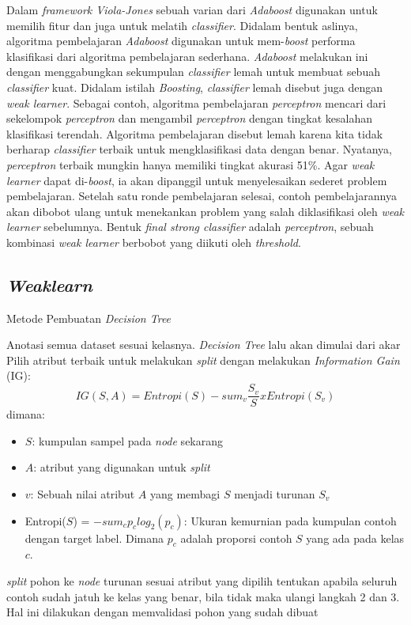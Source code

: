 Dalam \emph{framework Viola-Jones} sebuah varian dari \emph{Adaboost} 
digunakan untuk memilih fitur dan juga untuk melatih \textit{classifier}. 
Didalam bentuk aslinya, algoritma pembelajaran \emph{Adaboost} digunakan 
untuk mem-\textit{boost} performa klasifikasi dari algoritma pembelajaran 
sederhana. \emph{Adaboost} melakukan ini dengan menggabungkan sekumpulan 
\emph{classifier} lemah untuk membuat sebuah \emph{classifier} kuat. 
Didalam istilah \emph{Boosting}, \emph{classifier} lemah disebut juga 
dengan \emph{weak learner}. Sebagai contoh, algoritma pembelajaran \emph{perceptron} 
mencari dari sekelompok \emph{perceptron} dan mengambil \emph{perceptron} 
dengan tingkat kesalahan klasifikasi terendah. Algoritma pembelajaran disebut 
lemah karena kita tidak berharap \emph{classifier} terbaik untuk mengklasifikasi 
data dengan benar. Nyatanya, \emph{perceptron} terbaik mungkin 
hanya memiliki tingkat akurasi 51\%. Agar \emph{weak learner} dapat di-\textit{boost}, 
ia akan dipanggil untuk menyelesaikan sederet problem pembelajaran. Setelah 
satu ronde pembelajaran selesai, contoh pembelajarannya akan dibobot ulang 
untuk menekankan problem yang salah diklasifikasi oleh \emph{weak learner} 
sebelumnya. Bentuk \emph{final strong classifier} adalah \emph{perceptron}, 
sebuah kombinasi \emph{weak learner} berbobot yang diikuti oleh \emph{threshold}.

\subsection{\emph{Weaklearn}}

\begin{algorithm}
  \caption{Metode Pembuatan \textit{Decision Tree}}
  \begin{algorithmic} [1]
    \State Anotasi semua dataset sesuai kelasnya. \textit{Decision Tree} lalu 
    akan dimulai dari akar
    \State Pilih atribut terbaik untuk melakukan \textit{split} dengan melakukan 
    \emph{Information Gain} (IG):
    \begin{equation}
      IG(S, A) = Entropi(S) - sum_v \frac{S_v}{S} x Entropi(S_v)
    \end{equation} 
    dimana:
    \begin{itemize}
      \item $S$: kumpulan sampel pada \emph{node} sekarang
      \item $A$: atribut yang digunakan untuk \textit{split}
      \item $v$: Sebuah nilai atribut $A$ yang membagi $S$ menjadi turunan $S_v$
      \item Entropi($S$) = $-sum_c p_c log_2(p_c)$: Ukuran kemurnian pada kumpulan 
      contoh dengan target label. Dimana $p_c$ adalah proporsi contoh $S$ yang ada 
      pada kelas $c$. 
    \end{itemize}
    \State \textit{split} pohon ke \textit{node} turunan sesuai atribut yang dipilih 
    \State tentukan apabila seluruh contoh sudah jatuh ke kelas yang benar, bila tidak 
    maka ulangi langkah 2 dan 3. Hal ini dilakukan dengan memvalidasi pohon  yang 
    sudah dibuat
  \end{algorithmic}
\end{algorithm}

